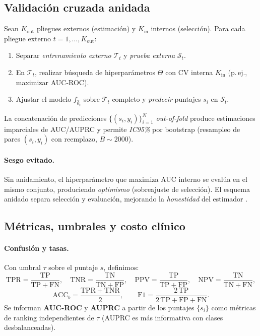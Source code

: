 \subsection{Validación cruzada anidada}
\label{subsec:nested}

Sean $K_\text{out}$ pliegues externos (estimación) y $K_\text{in}$ internos (selección). Para cada pliegue externo $t=1,\dots,K_\text{out}$:
\begin{enumerate}
\item Separar \emph{entrenamiento externo} $\mathcal{T}_t$ y \emph{prueba externa} $\mathcal{S}_t$.
\item En $\mathcal{T}_t$, realizar búsqueda de hiperparámetros $\Theta$ con CV interna $K_\text{in}$ (p.\,ej., maximizar AUC-ROC).
\item Ajustar el modelo $f_{\hat{\theta}_t}$ sobre $\mathcal{T}_t$ completo y \emph{predecir} puntajes $s_i$ en $\mathcal{S}_t$.
\end{enumerate}
La concatenación de predicciones $\{(s_i,y_i)\}_{i=1}^N$ \emph{out-of-fold} produce estimaciones imparciales de AUC/AUPRC y permite \emph{IC95\%} por bootstrap (resampleo de pares $(s_i,y_i)$ con reemplazo, $B\sim 2000$).

\paragraph{Sesgo evitado.} Sin anidamiento, el hiperparámetro que maximiza AUC interno se evalúa en el mismo conjunto, produciendo \emph{optimismo} (sobreajuste de selección). El esquema anidado separa selección y evaluación, mejorando la \emph{honestidad} del estimador \cite{Tsamardinos2022Patterns}.

\subsection{Métricas, umbrales y costo clínico}
\label{subsec:metrics}

\paragraph{Confusión y tasas.} Con umbral $\tau$ sobre el puntaje $s$, definimos:
\[
\mathrm{TPR}=\frac{\mathrm{TP}}{\mathrm{TP}+\mathrm{FN}},\quad 
\mathrm{TNR}=\frac{\mathrm{TN}}{\mathrm{TN}+\mathrm{FP}},\quad
\mathrm{PPV}=\frac{\mathrm{TP}}{\mathrm{TP}+\mathrm{FP}},\quad
\mathrm{NPV}=\frac{\mathrm{TN}}{\mathrm{TN}+\mathrm{FN}},
\]
\[
\mathrm{ACC}_b=\frac{\mathrm{TPR}+\mathrm{TNR}}{2},\qquad
\mathrm{F1}=\frac{2\,\mathrm{TP}}{2\,\mathrm{TP}+\mathrm{FP}+\mathrm{FN}}.
\]
Se informan \textbf{AUC-ROC} y \textbf{AUPRC} a partir de los puntajes $\{s_i\}$ como métricas de ranking independientes de $\tau$ (AUPRC es más informativa con clases desbalanceadas).

